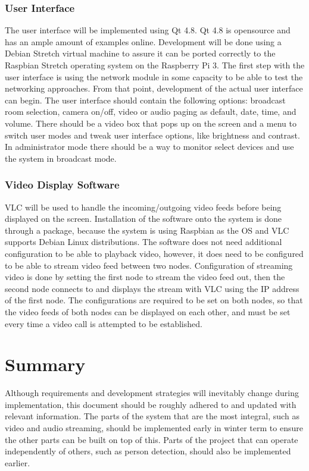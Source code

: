 \documentclass[onecolumn, draftclsnofoot,10pt, compsoc]{IEEEtran}
\begin{document}
\subsubsection{User Interface}
The user interface will be implemented using Qt 4.8. Qt 4.8 is opensource and has an ample amount of examples online. Development will be done using a Debian Stretch virtual machine to assure it can be ported correctly to the Raspbian Stretch operating system on the Raspberry Pi 3. The first step with the user interface is using the network module in some capacity to be able to test the networking approaches. From that point, development of the actual user interface can begin. The user interface should contain the following options: broadcast room selection, camera on/off, video or audio paging as default, date, time, and volume. There should be a video box that pops up on the screen and a menu to switch user modes and tweak user interface options, like brightness and contrast. In administrator mode there should be a way to monitor select devices and use the system in broadcast mode.

\subsubsection{Video Display Software}
VLC will be used to handle the incoming/outgoing video feeds before being displayed on the screen.
Installation of the software onto the system is done through a package, because the system is using Raspbian as the OS and VLC supports Debian Linux distributions.
The software does not need additional configuration to be able to playback video, however, it does need to be configured to be able to stream video feed between two nodes.
Configuration of streaming video is done by setting the first node to stream the video feed out, then the second node connects to and displays the stream with VLC using the IP address of the first node.
The configurations are required to be set on both nodes, so that the video feeds of both nodes can be displayed on each other, and must be set every time a video call is attempted to be established.

\section{Summary}
Although requirements and development strategies will inevitably change during implementation, this document should be roughly adhered to and updated with relevant information. The parts of the system that are the most integral, such as video and audio streaming, should be implemented early in winter term to ensure the other parts can be built on top of this. Parts of the project that can operate independently of others, such as person detection, should also be implemented earlier. 
\end{document}
